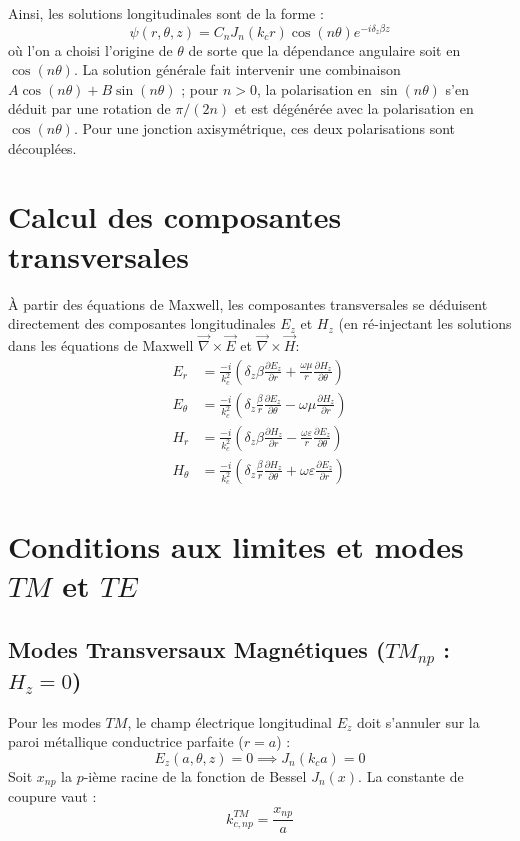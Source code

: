 \documentclass[12pt,a4paper]{report}
\begin{document}
Ainsi, les solutions longitudinales sont de la forme :
\begin{equation}
\psi(r,\theta,z) = C_n J_n(k_c r) \cos(n\theta) e^{-i\delta_z\beta z}
\end{equation}
où l'on a choisi l'origine de $\theta$ de sorte que la dépendance angulaire soit en $\cos(n\theta)$. La solution générale fait intervenir une combinaison $A\cos(n\theta)+B\sin(n\theta)$ ; pour $n>0$, la polarisation en $\sin(n\theta)$ s'en déduit par une rotation de $\pi/(2n)$ et est dégénérée avec la polarisation en $\cos(n\theta)$. Pour une jonction axisymétrique, ces deux polarisations sont découplées.

\section{Calcul des composantes transversales}
À partir des équations de Maxwell, les composantes transversales se déduisent directement des composantes longitudinales $E_z$ et $H_z$ (en ré-injectant les solutions dans les équations de Maxwell $\vec{\nabla} \times \vec{E}$ et $\vec{\nabla} \times \vec{H}$:
\begin{align}
E_r &= \frac{-i}{k_c^2} \left( \delta_z \beta \frac{\partial E_z}{\partial r} + \frac{\omega\mu}{r} \frac{\partial H_z}{\partial \theta} \right) \\
E_\theta &= \frac{-i}{k_c^2} \left( \delta_z \frac{\beta}{r} \frac{\partial E_z}{\partial \theta} - \omega\mu \frac{\partial H_z}{\partial r} \right) \\
H_r &= \frac{-i}{k_c^2} \left( \delta_z \beta \frac{\partial H_z}{\partial r} - \frac{\omega\varepsilon}{r} \frac{\partial E_z}{\partial \theta} \right) \\
H_\theta &= \frac{-i}{k_c^2} \left( \delta_z \frac{\beta}{r} \frac{\partial H_z}{\partial \theta} + \omega\varepsilon \frac{\partial E_z}{\partial r} \right)
\end{align}

\section{Conditions aux limites et modes $TM$ et $TE$}

\subsection{Modes Transversaux Magnétiques ($TM_{np}$ : $H_z = 0$)}
Pour les modes $TM$, le champ électrique longitudinal $E_z$ doit s'annuler sur la paroi métallique conductrice parfaite ($r = a$) :
\begin{equation}
E_z(a, \theta, z) = 0 \implies J_n(k_c a) = 0
\end{equation}
Soit $x_{np}$ la $p$-ième racine de la fonction de Bessel $J_n(x)$. La constante de coupure vaut :
\begin{equation}
k_{c,np}^{TM} = \frac{x_{np}}{a}
\end{equation}
\end{document}
